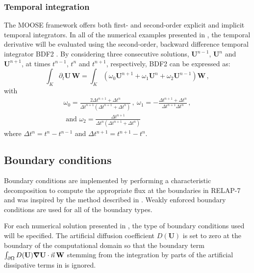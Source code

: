 \documentclass{mc2015}
\begin{document}
\subsubsection{Temporal integration} 
%
The MOOSE framework offers both first- and second-order explicit and implicit temporal integrators. 
In all of the numerical examples presented in , the temporal derivative  will be 
evaluated using the second-order, backward difference temporal integrator BDF2 \cite{bdf2}. By considering three 
consecutive solutions, $\mathbf U^{n-1}$, $\mathbf U^n$ and $\mathbf U^{n+1}$, at times $t^{n-1}$, $t^n$ and $t^{n+1}$, respectively, BDF2 can be expressed as:
\begin{equation}
\label{eq:BDF2}
\int_{K} \partial_t \mathbf U \, \mathbf  W = \int_{K} \left( \omega_0 \mathbf U^{n+1}  + \omega_1 \mathbf U^n + \omega_2 \mathbf U^{n-1} \right) \mathbf W \,,
\end{equation}
with
\begin{multline}
\omega_0 =\frac{2\Delta t^{n+1}+\Delta t^n}{\Delta t^{n+1} \left( \Delta t^{n+1}+\Delta t^n \right)} \, , \ 
\omega_1 = -\frac{\Delta t^{n+1}+\Delta t^n}{\Delta t^{n+1} \Delta t^n}  \, , \\
\text{ and } \omega_2 = \frac{\Delta t^{n+1}}{\Delta t^n \left( \Delta t^{n+1} + \Delta t^n \right)} \nonumber
\end{multline}
where $\Delta t^{n} = t^n-t^{n-1}$ and $\Delta t^{n+1} = t^{n+1}-t^{n}$.
%
\subsection{Boundary conditions} \label{sec:bc}
%
Boundary conditions are implemented by performing a characteristic decomposition to compute the 
appropriate flux at the boundaries in RELAP-7 and was inspired by the method described in \cite{SEM}. 
Weakly enforced boundary conditions are used for all of the boundary types.

For each numerical solution presented in , the type of boundary conditions used 
will be specified. The artificial diffusion coefficient $D(\mathbf  U)$ is set to zero at the boundary of the computational 
domain so that the boundary term 
$\int_{\partial \Omega} D(\mathbf  U) \boldsymbol\nabla \mathbf  U \cdot \vec{n} \, \mathbf W$ stemming from the 
integration by parts of the artificial dissipative terms in \eqt{eq:cfem} is ignored.
%
\end{document}
